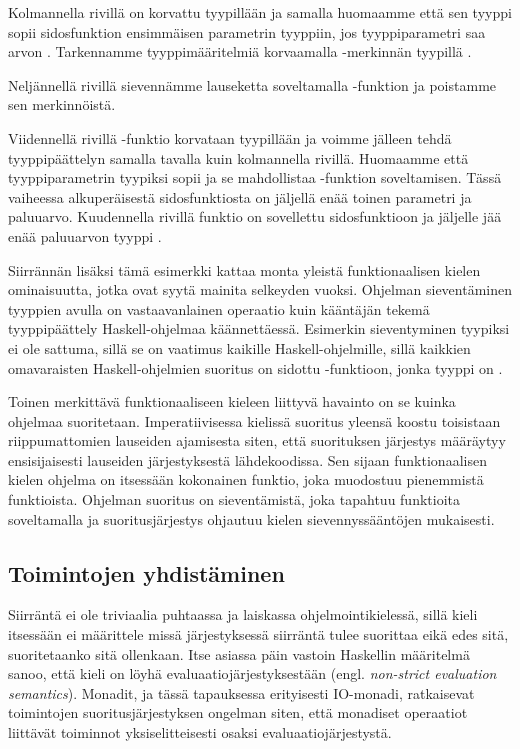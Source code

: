 \documentclass[finnish]{tktltiki2}
\begin{document}
Kolmannella rivillä  on korvattu tyypillään ja samalla huomaamme että sen tyyppi sopii
sidosfunktion ensimmäisen parametrin tyyppiin, jos tyyppiparametri  saa arvon .
Tarkennamme tyyppimääritelmiä korvaamalla  -merkinnän tyypillä .

Neljännellä rivillä sievennämme lauseketta soveltamalla -funktion ja poistamme sen
merkinnöistä. 

Viidennellä rivillä -funktio korvataan tyypillään ja voimme jälleen tehdä
tyyppipäättelyn samalla tavalla kuin kolmannella rivillä. Huomaamme että tyyppiparametrin 
tyypiksi sopii \code{()} ja se mahdollistaa -funktion soveltamisen. Tässä vaiheessa
alkuperäisestä sidosfunktiosta on jäljellä enää toinen parametri ja paluuarvo. Kuudennella rivillä
funktio  on sovellettu sidosfunktioon ja jäljelle jää enää paluuarvon tyyppi .

Siirrännän lisäksi tämä esimerkki kattaa monta yleistä funktionaalisen kielen ominaisuutta, jotka
ovat syytä mainita selkeyden vuoksi. Ohjelman sieventäminen tyyppien avulla on vastaavanlainen
operaatio kuin kääntäjän tekemä tyyppipäättely Haskell-ohjelmaa käännettäessä. Esimerkin
sieventyminen tyypiksi  ei ole sattuma, sillä se on vaatimus kaikille
Haskell-ohjelmille, sillä kaikkien omavaraisten Haskell-ohjelmien suoritus on sidottu
-funktioon, jonka tyyppi on .

Toinen merkittävä funktionaaliseen kieleen liittyvä havainto on se kuinka ohjelmaa suoritetaan.
Imperatiivisessa kielissä suoritus yleensä koostu toisistaan riippumattomien lauseiden ajamisesta
siten, että suorituksen järjestys määräytyy ensisijaisesti lauseiden järjestyksestä lähdekoodissa.
Sen sijaan funktionaalisen kielen ohjelma on itsessään kokonainen funktio, joka muodostuu
pienemmistä funktioista. Ohjelman suoritus on sieventämistä, joka tapahtuu funktioita soveltamalla
ja suoritusjärjestys ohjautuu kielen sievennyssääntöjen mukaisesti.

\subsection{Toimintojen yhdistäminen}

Siirräntä ei ole triviaalia puhtaassa ja laiskassa ohjelmointikielessä, sillä kieli itsessään ei
määrittele missä järjestyksessä siirräntä tulee suorittaa eikä edes sitä, suoritetaanko sitä
ollenkaan. Itse asiassa päin vastoin Haskellin määritelmä sanoo, että kieli on löyhä
evaluaatiojärjestyksestään (engl. \emph{non-strict evaluation semantics}). Monadit, ja tässä
tapauksessa erityisesti IO-monadi, ratkaisevat toimintojen suoritusjärjestyksen ongelman siten, että
monadiset operaatiot liittävät toiminnot yksiselitteisesti osaksi evaluaatiojärjestystä.
\end{document}
